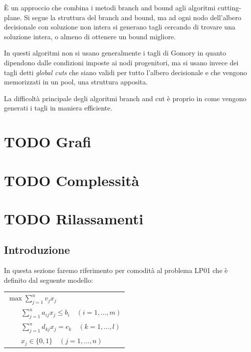 \documentclass[11pt, oneside]{book}
\begin{document}
\`E un approccio che combina i metodi branch and bound agli algoritmi
cutting-plane. Si segue la struttura del branch and bound, ma ad ogni
nodo dell'albero decisionale con soluzione non intera si generano
tagli cercando di trovare una soluzione intera, o almeno di ottenere
un bound migliore.

In questi algoritmi non si usano generalmente i tagli di Gomory in
quanto dipendono dalle condizioni imposte ai nodi progenitori, ma si
usano invece dei tagli detti {\em global cuts} che siano validi per
tutto l'albero decisionale e che vengono memorizzati in un pool, una
struttura apposita.

La difficolt\`a principale degli algoritmi branch and cut \`e proprio
in come vengono generati i tagli in maniera efficiente.

\chapter{TODO Grafi}
\chapter{TODO Complessit\`a}


\chapter{TODO Rilassamenti}

\section{Introduzione}

In questa sezione faremo riferimento per comodit\`a al problema LP01
che \`e definito dal seguente modello:

\begin{center}
\begin{tabular}{l}
$\max \sum\limits_{j=1}^n v_j x_j $\\
$\qquad \sum\limits_{j=1}^{n} a_{ij} x_j \leq b_i \quad (i=1,\dots,m)$
  \\
$\qquad \sum\limits_{j=1}^{n} d_{kj} x_j = e_k \quad (k=1,\dots,l)$ \\
$\qquad x_j \in \{0,1\} \quad (j=1,\dots,n)$
\end{tabular}
\end{center}
\end{document}
